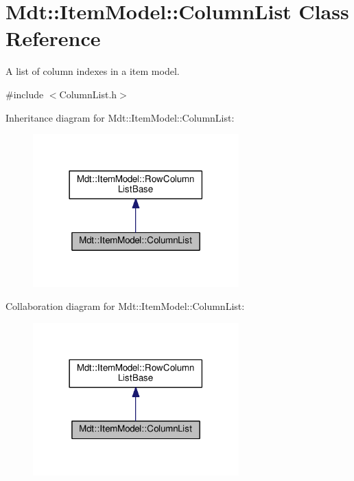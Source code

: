 \hypertarget{class_mdt_1_1_item_model_1_1_column_list}{}\section{Mdt\+:\+:Item\+Model\+:\+:Column\+List Class Reference}
\label{class_mdt_1_1_item_model_1_1_column_list}


A list of column indexes in a item model.  




{\ttfamily \#include $<$Column\+List.\+h$>$}



Inheritance diagram for Mdt\+:\+:Item\+Model\+:\+:Column\+List\+:
\nopagebreak
\begin{figure}[H]
\begin{center}
\leavevmode
\includegraphics[width=225pt]{class_mdt_1_1_item_model_1_1_column_list__inherit__graph}
\end{center}
\end{figure}


Collaboration diagram for Mdt\+:\+:Item\+Model\+:\+:Column\+List\+:
\nopagebreak
\begin{figure}[H]
\begin{center}
\leavevmode
\includegraphics[width=225pt]{class_mdt_1_1_item_model_1_1_column_list__coll__graph}
\end{center}
\end{figure}
